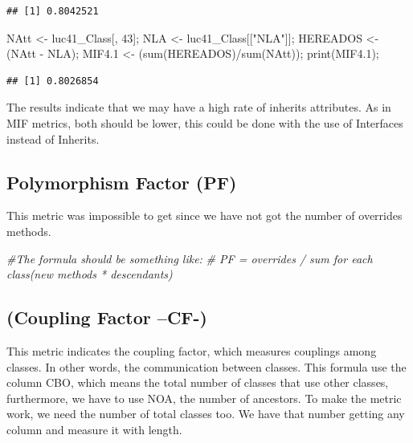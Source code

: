 \documentclass[
]{article}
\newenvironment{Shaded}{\begin{snugshade}}{\end{snugshade}}
\newcommand{\CommentTok}[1]{\textcolor[rgb]{0.56,0.35,0.01}{\textit{#1}}}
\newcommand{\DecValTok}[1]{\textcolor[rgb]{0.00,0.00,0.81}{#1}}
\newcommand{\FloatTok}[1]{\textcolor[rgb]{0.00,0.00,0.81}{#1}}
\newcommand{\FunctionTok}[1]{\textcolor[rgb]{0.00,0.00,0.00}{#1}}
\newcommand{\NormalTok}[1]{#1}
\newcommand{\OtherTok}[1]{\textcolor[rgb]{0.56,0.35,0.01}{#1}}
\newcommand{\SpecialCharTok}[1]{\textcolor[rgb]{0.00,0.00,0.00}{#1}}
\newcommand{\StringTok}[1]{\textcolor[rgb]{0.31,0.60,0.02}{#1}}
\begin{document}
\begin{verbatim}
## [1] 0.8042521
\end{verbatim}

\begin{Shaded}
\begin{Highlighting}[]
\NormalTok{NAtt }\OtherTok{\textless{}{-}}\NormalTok{ luc41\_Class[, }\DecValTok{43}\NormalTok{];}
\NormalTok{NLA }\OtherTok{\textless{}{-}}\NormalTok{ luc41\_Class[[}\StringTok{"NLA"}\NormalTok{]];}
\NormalTok{HEREADOS }\OtherTok{\textless{}{-}}\NormalTok{ (NAtt }\SpecialCharTok{{-}}\NormalTok{ NLA);}
\NormalTok{MIF4}\FloatTok{.1} \OtherTok{\textless{}{-}}\NormalTok{ (}\FunctionTok{sum}\NormalTok{(HEREADOS)}\SpecialCharTok{/}\FunctionTok{sum}\NormalTok{(NAtt));}
\FunctionTok{print}\NormalTok{(MIF4}\FloatTok{.1}\NormalTok{);}
\end{Highlighting}
\end{Shaded}

\begin{verbatim}
## [1] 0.8026854
\end{verbatim}

The results indicate that we may have a high rate of inherits
attributes. As in MIF metrics, both should be lower, this could be done
with the use of Interfaces instead of Inherits.

\hypertarget{polymorphism-factor-pf}{%
\subsection{Polymorphism Factor (PF)}\label{polymorphism-factor-pf}}

This metric was impossible to get since we have not got the number of
overrides methods.

\begin{Shaded}
\begin{Highlighting}[]
\CommentTok{\#The formula should be something like:}
\CommentTok{\# PF = overrides / sum for each class(new methods * descendants)}
\end{Highlighting}
\end{Shaded}

\hypertarget{coupling-factor-cf-}{%
\subsection{(Coupling Factor --CF-)}\label{coupling-factor-cf-}}

This metric indicates the coupling factor, which measures couplings
among classes. In other words, the communication between classes. This
formula use the column CBO, which means the total number of classes that
use other classes, furthermore, we have to use NOA, the number of
ancestors. To make the metric work, we need the number of total classes
too. We have that number getting any column and measure it with length.
\end{document}
